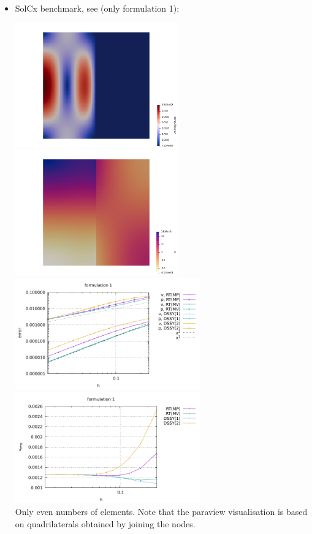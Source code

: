 \begin{itemize}
\item SolCx benchmark, see  (only formulation 1):

\begin{center}
\includegraphics[width=7cm]{python_codes/fieldstone_77/results/solcx/vel}
\includegraphics[width=7cm]{python_codes/fieldstone_77/results/solcx/press}\\
\includegraphics[width=8cm]{python_codes/fieldstone_77/results/solcx/errors_form1}
\includegraphics[width=8cm]{python_codes/fieldstone_77/results/solcx/vrms_form1}\\
{\captionfont Only even numbers of elements. Note that the paraview visualisation is based on 
quadrilaterals obtained by joining the nodes.}
\end{center}


\end{itemize}


